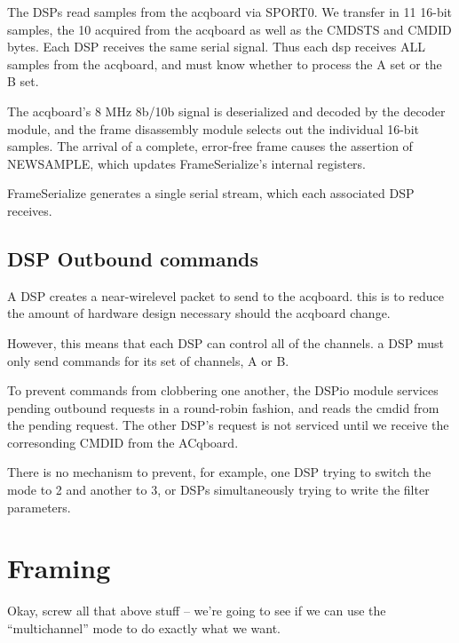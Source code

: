 The DSPs read samples from the acqboard via SPORT0. We transfer in 11
16-bit samples, the 10 acquired from the acqboard as well as the
CMDSTS and CMDID bytes. Each DSP receives the same serial signal. Thus
each dsp receives ALL samples from the acqboard, and must know whether
to process the A set or the B set.

The acqboard's 8 MHz 8b/10b signal is deserialized and decoded by the
decoder module, and the frame disassembly module selects out the
individual 16-bit samples. The arrival of a complete, error-free frame
causes the assertion of NEWSAMPLE, which updates FrameSerialize's
internal registers.

FrameSerialize generates a single serial stream, which each associated
DSP receives.

\subsection{DSP Outbound commands}
A DSP creates a near-wirelevel packet to send to the acqboard. this is
to reduce the amount of hardware design necessary should the acqboard
change.

However, this means that each DSP can control all of the channels. a DSP must only send commands for its set of channels, A or B. 

To prevent commands from clobbering one another, the DSPio module services pending outbound requests in a round-robin fashion, and reads the cmdid from the pending request. The other DSP's request is not serviced until we receive the corresonding CMDID from the ACqboard. 

There is no mechanism to prevent, for example, one DSP trying to
switch the mode to 2 and another to 3, or DSPs simultaneously trying
to write the filter parameters.


\section{Framing}
Okay, screw all that above stuff -- we're going to see if we can use the ``multichannel'' mode to do exactly what we want. 

